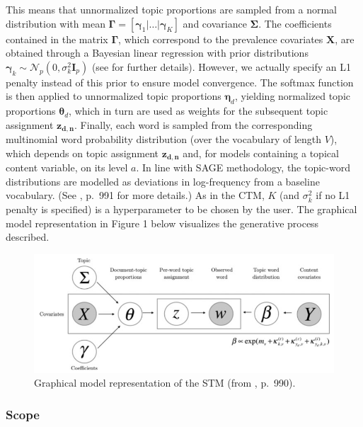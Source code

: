 \noindent
This means that unnormalized topic proportions are sampled from a normal distribution with mean $\boldsymbol{\Gamma} = [\boldsymbol{\gamma}_1|\dots|\boldsymbol{\gamma}_K]$ and covariance $\boldsymbol{\Sigma}$. The coefficients contained in the matrix $\boldsymbol{\Gamma}$, which correspond to the prevalence covariates $\boldsymbol{X}$, are obtained through a Bayesian linear regression with prior distributions $\boldsymbol{\gamma}_k \sim \mathcal{N}_p(0, \sigma_k^2\boldsymbol{I}_p)$ (see \citealp{roberts2016model} for further details). However, we actually specify an L1 penalty instead of this prior to ensure model convergence. The softmax function is then applied to unnormalized topic proportions $\boldsymbol{\eta}_d$, yielding normalized topic proportions $\boldsymbol{\theta}_d$, which in turn are used as weights for the subsequent topic assignment $\boldsymbol{z_{d,n}}$. Finally, each word is sampled from the corresponding multinomial word probability distribution (over the vocabulary of length $V$), which depends on topic assignment $\boldsymbol{z_{d,n}}$ and, for models containing a topical content variable, on its level $a$. In line with SAGE methodology, the topic-word distributions are modelled as deviations in log-frequency from a baseline vocabulary. (See \citealp{roberts2016model}, p.\ 991 for more details.) As in the CTM, $K$ (and $\sigma_k^2$ if no L1 penalty is specified) is a hyperparameter to be chosen by the user. The graphical model representation in Figure 1 below visualizes the generative process described.


\begin{figure}[h!]
  \centering
  \captionsetup{justification=centering,margin=2cm}
  \includegraphics[scale = 0.5]{../plots/2/stm_graphical.png}
  \caption{Graphical model representation of the STM (from \cite{roberts2016model}, p.\ 990).}
  \label{fig:graphical_model}
\end{figure}

\subsubsection*{Scope}

